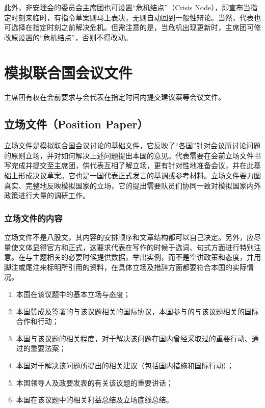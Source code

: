 \documentclass[a4paper,openany]{book}
\begin{document}
此外，非安理会的委员会主席团也可设置“危机结点”（Crisis Node），即宣布当指定时刻来临时，有指令草案则马上表决，无则自动回到一般性辩论。当然，代表也可选择在指定时刻之前解决危机。但需注意的是，当危机出现更新时，主席团可修改原设置的“危机结点”，否则不得改动。

\chapter{模拟联合国会议文件}

主席团有权在会前要求与会代表在指定时间内提交建议案等会议文件。

\section{立场文件（Position Paper）}

立场文件是模拟联合国会议讨论的基础文件，它反映了“各国”针对会议所讨论问题的原则立场，并对如何解决上述问题提出本国的意见。代表需要在会前立场文件书写完成并提交至主席团，供代表互相了解立场，更有针对性地准备会议，并在此基础上形成决议草案。它也是一国代表正式发言的基调或参考材料。立场文件要力图真实、完整地反映模拟国家的立场，它的提出需要队员们协同一致对模拟国家内外政策进行大量的调研工作。

\subsection{立场文件的内容}

立场文件不是八股文，其内容的安排顺序和文章结构都可以自己决定。另外，应尽量使文体显得官方和正式，这要求代表在写作的时候于选词、句式方面进行特别注意。在与主题相关的必要时候提供数据，举出实例，而不是空讲政策和态度，并用脚注或尾注来标明所引用的资料，在具体立场及措辞方面都要符合本国的实际情况。

\begin{enumerate}

\item 本国在该议题中的基本立场与态度；

\item 本国赞成及签署的与该议题相关的国际协议，本国参与的与该议题相关的国际合作和行动；

\item 本国与该议题的相关程度，对于解决该问题在国内曾经采取过的重要行动、通过的重要法案；

\item 本国对于解决该问题所提出的相关建议（包括国内措施和国际行动）；

\item 本国领导人及政要发表的有关该议题的重要讲话；

\item 本国在该议题中的相关利益总结及立场底线总结。

\end{enumerate}
\end{document}
